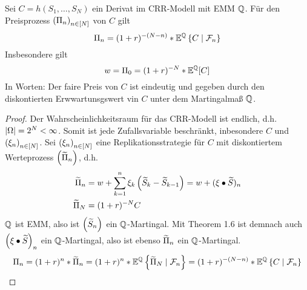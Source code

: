 \begin{theorem}
	Sei $C= h(S_1, \dots, S_N)$ ein Derivat im CRR-Modell mit EMM $\mathbb{Q}$. Für den Preisprozess $\left( \Pi_n \right)_{n \in [N]}$ von $C$ gilt
	\begin{equation*}
		\Pi_n = (1+r)^{-(N-n)} * \mathbb{E}^{\mathbb{Q}}\left\{ C \mid \mathcal{F}_n \right\}
	\end{equation*}
	Insbesondere gilt
	\begin{equation*}
		w = \Pi_0 = (1+r)^{-N} * \mathbb{E}^{\mathbb{Q}}[C]
	\end{equation*}
	In Worten: Der faire Preis von $C$ ist eindeutig und gegeben durch den diskontierten Erwwartunsgswert vin $C$ unter dem Martingalmaß $\mathbb{Q}$.
\end{theorem}
\begin{proof}
	Der Wahrscheinlichkeitsraum für das CRR-Modell ist endlich, d.h. $\left| \Omega \right| = 2^N < \infty$. Somit ist jede Zufallsvariable beschränkt, inbesondere $C$ und $\left( \xi_n \right)_{n \in [N]}$. Sei $\left( \xi_n \right)_{n \in [N]}$ eine Replikationsstrategie für $C$ mit diskontiertem Werteprozess $\left( \widetilde{\Pi}_n \right)_{}$, d.h.
	\begin{equation*}
		\begin{aligned}
			\widetilde{\Pi}_n &= w + \sum_{k=1}^n \xi_k \left( \widetilde{S}_k - \widetilde{S}_{k-1} \right) = w + (\xi \bullet \widetilde{S})_n \\
			\widetilde{\Pi}_N &= (1+r)^{-N} C
		\end{aligned}
	\end{equation*}
	$\mathbb{Q}$ ist EMM, also ist $\left( \widetilde{S}_n \right)_{}$ ein $\mathbb{Q}$-Martingal. Mit Theorem 1.6 ist demnach auch $\left( \xi \bullet \widetilde{S} \right)_{n}$ ein $\mathbb{Q}$-Martingal, also ist ebenso $\widetilde{\Pi}_n$ ein $\mathbb{Q}$-Martingal.
	\begin{equation*}
		\Pi_n = (1+r)^{n} * \widetilde{\Pi}_n = (1+r)^n * \mathbb{E}^{\mathbb{Q}} \left\{ \widetilde{\Pi}_N \mid \mathcal{F}_n \right\} = (1+r)^{-(N-n)} * \mathbb{E}^{\mathbb{Q}}\left\{ C \mid \mathcal{F}_n \right\}
	\end{equation*}
\end{proof}

